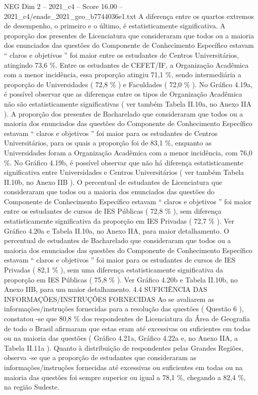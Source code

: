 \begin{textsample}{NEG Dim 2 – 2021\_c4 – Score 16.00 – 2021\_c4/enade\_2021\_geo\_b7744036e1.txt}
A diferença entre os quartos extremos de desempenho, o primeiro e o último, é estatisticamente significativa.
A proporção dos presentes de Licenciatura que consideraram que todos ou a maioria dos enunciados das questões do Componente de Conhecimento Específico estavam “ claros e objetivos ” foi maior entre os estudantes de Centros Universitários, atingindo 73,6 \%.
Entre os estudantes de CEFET/IF, a Organização Acadêmica com a menor incidência, essa proporção atingiu 71,1 \%, sendo intermediária a proporção de Universidades ( 72,8 \% ) e Faculdades ( 72,0 \% ).
No Gráfico 4.19a, é possível observar que as diferenças entre os tipos de Organização Acadêmica não são estatisticamente significativas ( ver também Tabela II.10a, no Anexo IIA ).
A proporção dos presentes de Bacharelado que consideraram que todos ou a maioria dos enunciados das questões do Componente de Conhecimento Específico estavam “ claros e objetivos ” foi maior para os estudantes de Centros Universitários, para os quais a proporção foi de 83,1 \%, enquanto as Universidades foram a Organização Acadêmica com a menor incidência, com 76,0 \%.
No Gráfico 4.19b, é possível observar que não há diferença estatisticamente significativa entre Universidades e Centros Universitários ( ver também Tabela II.10b, no Anexo IIB ).
O percentual de estudantes de Licenciatura que consideraram que todos ou a maioria dos enunciados das questões do Componente de Conhecimento Específico estavam “ claros e objetivos ” foi maior entre os estudantes de cursos de IES Públicas ( 72,8 \% ), sem diferença estatisticamente significativa da proporção em IES Privadas ( 72,7 \% ).
Ver Gráfico 4.20a e Tabela II.10a, no Anexo IIA, para maior detalhamento.
O percentual de estudantes de Bacharelado que consideraram que todos ou a maioria dos enunciados das questões do Componente de Conhecimento Específico estavam “ claros e objetivos ” foi maior para os estudantes de cursos de IES Privadas ( 82,1 \% ), sem uma diferença estatisticamente significativa da proporção em IES Públicas ( 75,8 \% ).
Ver Gráfico 4.20b e Tabela II.10b, no Anexo IIB, para um maior detalhamento. 4.4 SUFICIÊNCIA DAS INFORMAÇÕES/INSTRUÇÕES FORNECIDAS Ao se avaliarem as informações/instruções fornecidas para a resolução das questões ( Questão 6 ), constatou -se que 80,8 \% dos respondentes de Licenciatura da Área de Geografia de todo o Brasil afirmaram que estas eram até excessivas ou suficientes em todas ou na maioria das questões ( Gráfico 4.21a, Gráfico 4.22a e, no Anexo IIA, a Tabela II.11a ).
Quanto à distribuição de respondentes pelas Grandes Regiões, observa -se que a proporção de estudantes que consideraram as informações/instruções fornecidas até excessivas ou suficientes em todas ou na maioria das questões foi sempre superior ou igual a 78,1 \%, chegando a 82,4 \%, na região Sudeste.

\end{textsample}
